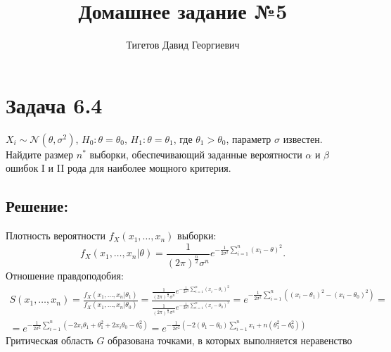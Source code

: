 \documentclass[12pt]{article}
\begin{document}
    \title{Домашнее задание №5}
    \author{Тигетов Давид Георгиевич}
    \date{}
    \maketitle

    \section*{Задача 6.4}
    $X_i \sim \mathcal{N} \left ( \theta, \sigma^2 \right )$, $H_0: \theta = \theta_0$, $H_1: \theta = \theta_1$, где $\theta_1 > \theta_0$, параметр $\sigma$ известен. Найдите размер
    $n^*$ выборки, обеспечивающий заданные вероятности $\alpha$ и $\beta$ ошибок I и II рода для наиболее мощного критерия.

    \subsection*{Решение:}
    Плотность вероятности $f_X(x_1, \dots, x_n)$ выборки:
    \[
        f_X(x_1, \dots, x_n | \theta) = \frac{1}{\left ( 2 \pi \right )^{\frac{n}{2}} \sigma^n} e^{-\frac{1}{2 \sigma^2} \sum_{i=1}^n \left ( x_i - \theta \right )^2}.
    \]
    Отношение правдоподобия:
    \begin{multline*}
        S(x_1, \dots, x_n)
        = \frac{f_X(x_1, \dots, x_n | \theta_1)}{f_X(x_1, \dots, x_n | \theta_0)}
        = \frac{\frac{1}{\left ( 2 \pi \right )^{\frac{n}{2}} \sigma^n} e^{-\frac{1}{2 \sigma^2} \sum_{i=1}^n \left ( x_i - \theta_1 \right )^2}}{\frac{1}{\left ( 2 \pi \right )^{\frac{n}{2}} \sigma^n} e^{-\frac{1}{2 \sigma^2} \sum_{i=1}^n \left ( x_i - \theta_0 \right )^2}}
        = e^{- \frac{1}{2 \sigma^2} \sum_{i=1}^n \left ( \left ( x_i - \theta_1 \right )^2 - \left ( x_i - \theta_0 \right )^2 \right )} = \\
        = e^{- \frac{1}{2 \sigma^2} \sum_{i=1}^n \left ( - 2 x_i \theta_1 + \theta_1^2 + 2 x_i \theta_0 - \theta_0^2 \right )}
        = e^{- \frac{1}{2 \sigma^2} \left ( - 2 \left ( \theta_1 - \theta_0 \right ) \sum_{i=1}^n x_i + n \left ( \theta_1^2 - \theta_0^2 \right ) \right )}
    \end{multline*}
    Гритическая область $G$ образована точками, в которых выполняется неравенство
\end{document}
